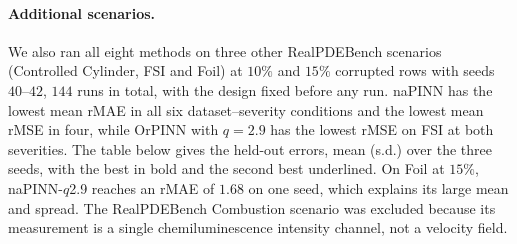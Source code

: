 \documentclass[twoside]{article}
\begin{document}
\paragraph{Additional scenarios.}
We also ran all eight methods on three other RealPDEBench scenarios (Controlled
Cylinder, FSI and Foil) at $10\%$ and $15\%$ corrupted rows with seeds
$40$--$42$, $144$ runs in total, with the design fixed before any run. naPINN has the lowest mean rMAE in all six
dataset--severity conditions and the lowest mean rMSE in four, while OrPINN with
$q = 2.9$ has the lowest rMSE on FSI at both severities. The table below gives
the held-out errors, mean (s.d.) over the three seeds, with the best in bold and
the second best underlined. On Foil at $15\%$, naPINN-$q$2.9 reaches an rMAE
of $1.68$ on one seed, which explains its large mean and spread. The RealPDEBench
Combustion scenario was excluded because its measurement is a single
chemiluminescence intensity channel, not a velocity field.
\end{document}
